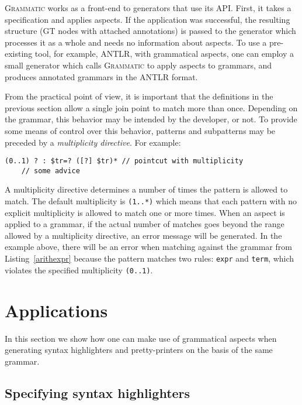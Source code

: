 \documentclass{IOS-Book-Article}     %
\newcommand{\lstref}[1]{Listing~\ref{#1}}
\newcommand{\tool}[1]{\textsc{#1}}
\newcommand{\Grammatic}[0]{\tool{Grammatic}}
\begin{document}
\Grammatic{} works as a front-end to generators that use its API. First, it takes a specification and applies aspects. If the application was successful, the resulting structure (GT nodes with attached annotations) is passed to the generator which processes it as a whole and needs no information about aspects. To use a pre-existing tool, for example, \tool{ANTLR}, with grammatical aspects, one can employ a small generator which calls \Grammatic{} to apply aspects to grammars, and produces annotated grammars in the ANTLR format.

From the practical point of view, it is important that the definitions in the previous section allow a single join point to match more than once. Depending on the grammar, this behavior may be intended by the developer, or not. To provide some means of control over this behavior, patterns and subpatterns may be preceded by a \emph{multiplicity directive}. For example:
\begin{lstlisting}[language=Grammatic]
(0..1) ? : $tr=? ([?] $tr)* // pointcut with multiplicity
    // some advice
\end{lstlisting}
A multiplicity directive determines a number of times the pattern is allowed to match. The default multiplicity is \texttt{(1..*)} which means that each pattern with no explicit multiplicity is allowed to match one or more times. When an aspect is applied to a grammar, if the actual number of matches goes beyond the range allowed by a multiplicity directive, an error message will be generated. In the example above, there will be an error when matching against the grammar from \lstref{arithexpr} because the pattern matches two rules: \texttt{expr} and \texttt{term}, which violates the specified multiplicity \texttt{(0..1)}.

\section{Applications}\label{Example}
In this section we show how one can make use of grammatical aspects when generating syntax highlighters and pretty-printers on the basis of the same grammar.
\subsection{Specifying syntax highlighters}
\end{document}
